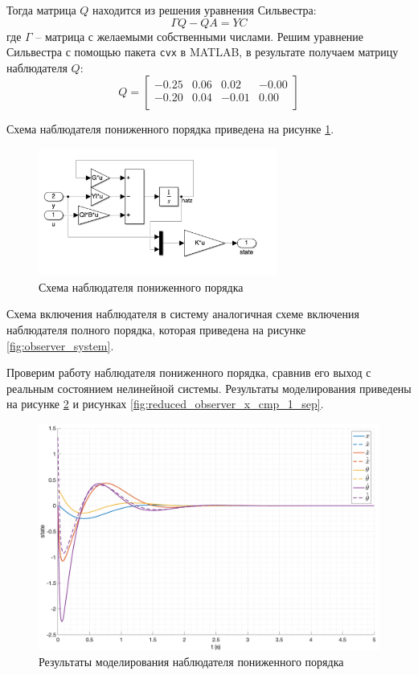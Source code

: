 Тогда матрица $Q$ находится из решения уравнения Сильвестра: 
\begin{equation}
   \Gamma Q - QA = YC 
\end{equation}
где $\Gamma$ -- матрица с желаемыми собственными числами. 
Решим уравнение Сильвестра с помощью пакета \texttt{cvx} в MATLAB, в результате получаем матрицу наблюдателя $Q$:
\begin{equation}
    Q = \begin{bmatrix}
    -0.25  & 0.06  & 0.02  & -0.00 \\ 
    -0.20  & 0.04  & -0.01  & 0.00 \\
    \end{bmatrix}
\end{equation}

Схема наблюдателя пониженного порядка приведена на рисунке \ref{fig:reduced_observer_scheme}.
\begin{figure}[ht!]
    \centering
    \includegraphics[width=0.7\textwidth]{media/reduced_observer_scheme.png}
    \caption{Схема наблюдателя пониженного порядка}
    \label{fig:reduced_observer_scheme}
\end{figure}

Схема включения наблюдателя в систему аналогичная схеме включения наблюдателя полного порядка, 
которая приведена на рисунке \ref{fig:observer_system}. 

Проверим работу наблюдателя пониженного порядка, сравнив его выход с реальным состоянием нелинейной системы.
Результаты моделирования приведены на рисунке \ref{fig:reduced_observer_x_1} и рисунках \ref{fig:reduced_observer_x_cmp_1_sep}.
\begin{figure}[ht!]
    \centering
    \includegraphics[width=\textwidth]{media/plots/reduced_observer/reduced_observer_cmp_1.png}
    \caption{Результаты моделирования наблюдателя пониженного порядка}
    \label{fig:reduced_observer_x_1}
\end{figure}

